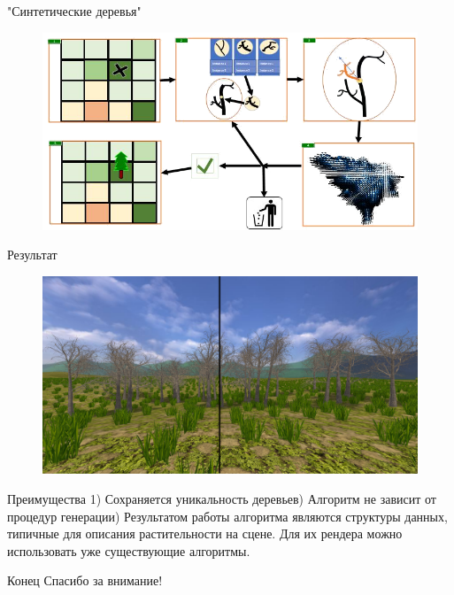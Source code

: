 \documentclass[14pt]{beamer}
\begin{document}
\begin{frame}{"Синтетические деревья"}
\begin{figure}[hbtp]
\includegraphics[scale=0.57]{Synts.png}
\end{figure}
\end{frame}
\begin{frame}{Результат}	
\begin{figure}[hbtp]
\includegraphics[scale=0.18]{synt_comparison_1.png}
\end{figure}
\end{frame}
\begin{frame}{Преимущества}
1) Сохраняется уникальность деревьев) Алгоритм не зависит от процедур генерации) Результатом работы алгоритма являются структуры данных, типичные для описания растительности на сцене. Для их рендера можно использовать уже существующие алгоритмы.
\end{frame}

\begin{frame}{Конец}
Спасибо за внимание!
\end{frame}
\end{document}
